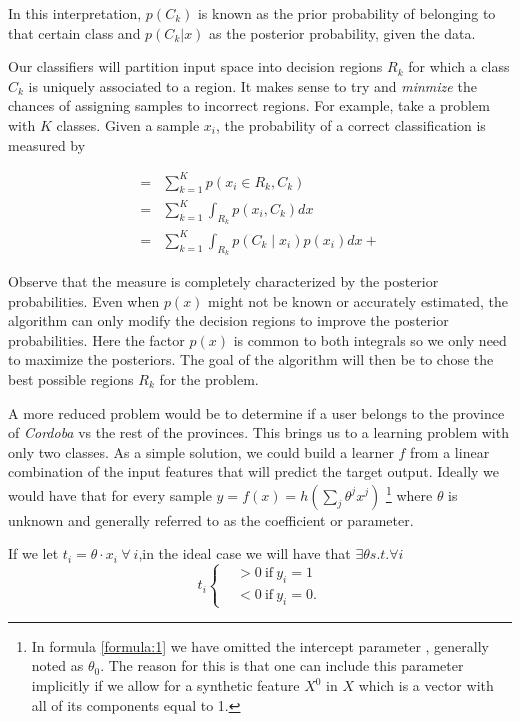 In this interpretation, $p(C_k)$ is known as the prior probability of belonging to that certain class and $p(C_k|x)$ as the posterior probability, given the data. 

Our classifiers will partition input space into decision regions $R_k$ for which a class $C_k$ is uniquely associated to a region. It makes sense to try and \textit{minmize} the chances of assigning samples to incorrect regions. For example, take a problem with $K$ classes. Given a sample $x_i$, the probability of a correct classification is measured by 

\begin{equation}
\begin{split}
=  & \sum_{k=1}^{K} p(x_i \in R_k, C_k )  \\
=  & \sum_{k=1}^{K} \int_{R_k}p(x_i,C_k) dx \\
=  & \sum_{k=1}^{K} \int_{R_k}p(C_k \mid x_i) p(x_i) dx + 
\end{split}
\end{equation}

Observe that the measure is completely characterized by the posterior probabilities. Even when $p(x)$ might not be known or accurately estimated, the algorithm can only modify the decision regions to improve the posterior probabilities. Here the factor $p(x)$ is common to both integrals so we only need to maximize the posteriors. The goal of the algorithm will then be to chose the best possible regions $R_k$ for the problem.
 
A more reduced problem would be to determine if a user belongs to the province of \textit{Cordoba} vs the rest of the provinces. This brings us to a learning problem with only two classes. %
As a simple solution, we could build a learner $f$ from a linear combination of the input features that will predict the target output. Ideally we would have that for every sample $y = f(x) = h\left(\sum_{j}\theta^jx^j\right)$ \label{formula:1} \footnote{In formula \ref{formula:1} we have omitted the intercept parameter , generally noted as $\theta_0$. The reason for this is that one can include this parameter implicitly if we allow for a synthetic feature $X^0$ in $X$ which is a vector with all of its components equal to 1.  } where $\theta$ is unknown and generally referred to as the coefficient or parameter.

If we let $ t_i = \theta \cdot x_i  \ \forall \ i $,in the ideal case we will have that $\exists \theta s.t. \forall i $ 
\[
    t_i
      \begin{cases}
        &>0 \ \mbox{if} \ y_i=1 \\
        &<0 \ \mbox{if} \ y_i=0.
      \end{cases}
    \]

